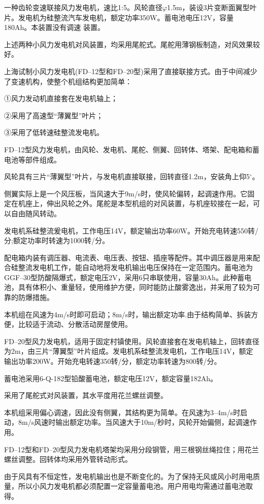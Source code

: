 \documentclass{ctexbook}
\begin{document}
一种齿轮变速联接风力发电机，速比1:5。风轮直径$\varphi$1.5m，装设3片变断面翼型叶片。发电机为硅整流汽车发电机，额定功率350W。蓄电池电压12V，容量180Ah。本装置没有调速
装置。

上述两种小风力发电机对风装置，均采用尾舵式。尾舵用薄钢板制造，对风效果较好。

上海试制小风力发电机(FD--12型和FD--20型)采用了直接联接方式。由于中间减少了变速机构，使整个机组结构更加简单：

①风力发动机直接套在发电机轴上；

②采用了高速型“薄翼型”叶片；

③采用了低转速硅整流发电机。

FD--12型风力发电机，由风轮、发电机、尾舵、侧翼、回转体、塔架、配电箱和蓄电池等部件组成。

风轮具有三片“薄翼型”叶片，与发电机直接联接，回转直径1.2m，安装角上仰5$^{\circ}$。

侧翼实际上是一个风压板，当风速大于9m/s时，使风轮偏转，起调速作用。它固定在机座上，伸出风轮之外。尾舵是本型机组的对风装置，与机座较接在一起，可以自由随风转动。

发电机系硅整流爰电机，工作电压14V，额定输出功率60W。开始充电转速550转/分;额定功率时转速为1000转/分。

配电箱内装有调压器、电流表、电压表、按钮、插座等配件。其中调压器是用来配合硅整流发电机工作，能自动地将发电机输出电压保持在一定范围内。蓄电池为GGF--30型防酸隔爆式，额定电压2V，采用6只串联使用，容量30Ah。此种蓄电池，具有体积小、重量轻，使用维护方便，同时能防止酸雾逸出，并采用了较为可靠的防爆措施。

本机组在风速为4m/s时即可启动；8m/s时，输出额定功率.由于结构简单、拆装方便，比较适于流动、分散活动房屋使用。

FD--20型风力发电机，适用于固定村镇使用。风轮直接套在发电机轴上，回转直径为2m，由三片“薄翼型”叶片组成。发电机系硅整流发电机，工作电压14V，额定输出功率200W。开始充电转速350转/分，额定功率转速为800转/分。

蓄电池采用6-Q-182型铅酸蓄电池，额定电压12V，额定容量182Ah。

采用了尾舵式对风装置，其水平度用花兰螺丝调整。

本机组采用偏心调速，因此没有侧翼，其结构更为简单。在风速为3--4m/s时启动，8m/s风速时输出额定功率。当风速大于10m/秒时，风轮开始偏侧，起调速作用。	

FD--12型和FD--20型风力发电机塔架均采用分段钢管，用三根钢丝绳拉住；用花兰螺丝调整。回转体均采用外管转动形式。

由于风具有不恒定性，发电机输出也是不断变化的。为了保持无风或风小时用电质量，所以小风力发电机都必须配置一定容量蓄电池。用户用电均需通过蓄电池取得。
\end{document}
